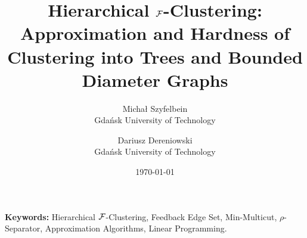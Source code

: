 \documentclass[11pt]{article}
\title{Hierarchical $\mathcal{F}$-Clustering: Approximation and Hardness of Clustering into Trees and Bounded Diameter Graphs}
\author{Michał Szyfelbein \\ Gdańsk University of Technology \and Dariusz Dereniowski \\ Gdańsk University of Technology}
\date{\today}
\theoremstyle{definition}
\begin{document}
\maketitle



\noindent
\textbf{Keywords:} Hierarchical $\mathcal{F}$-Clustering, Feedback Edge Set, Min-Multicut, $\rho$-Separator, Approximation Algorithms, Linear Programming.

\bigskip














\end{document}
